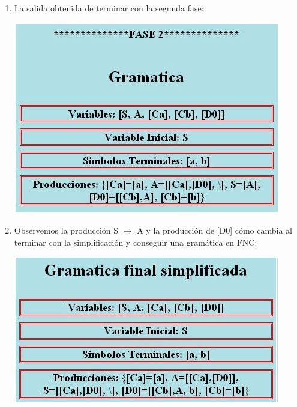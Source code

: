 \documentclass[12pt,a4paper,spanish]{book}
\begin{document}
\begin{enumerate}
\item La salida obtenida de terminar con la segunda fase:\\
\begin{center}
\includegraphics{chom4.jpg}
\end{center}
\item Observemos la producci\'on S $\rightarrow$ A y la producci\'on de [D0] c\'omo cambia al terminar con la simplificaci\'on y conseguir una gram\'atica en FNC:\\
\begin{center}
\includegraphics{chom5.jpg}
\end{center}
\end{enumerate}
\end{document}
